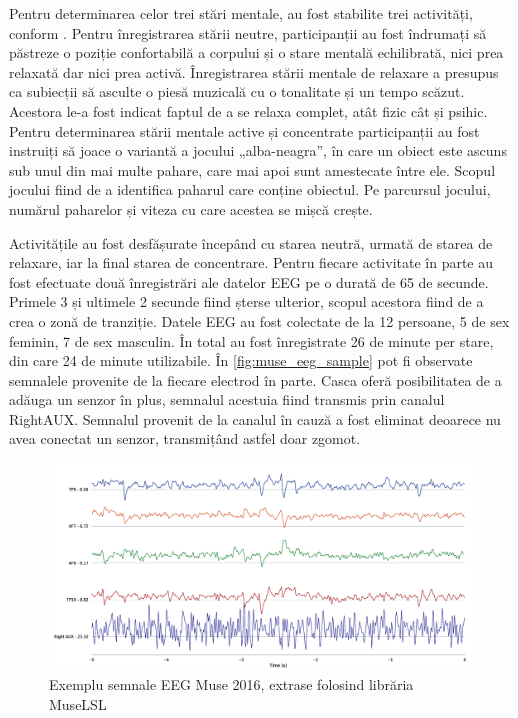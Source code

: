 Pentru determinarea celor trei stări mentale, au fost stabilite trei activități, conform \cite{eeg:2018}. Pentru înregistrarea stării neutre, participanții au fost îndrumați să păstreze o poziție confortabilă a corpului și o stare mentală echilibrată, nici prea relaxată dar nici prea activă. Înregistrarea stării mentale de relaxare a presupus ca subiecții să asculte o piesă muzicală cu o tonalitate și un tempo scăzut. Acestora le-a fost indicat faptul de a se relaxa complet, atât fizic cât și psihic. Pentru determinarea stării mentale active și concentrate participanții au fost instruiți să joace o variantă a jocului „alba-neagra”, în care un obiect este ascuns sub unul din mai multe pahare, care mai apoi sunt amestecate între ele. Scopul jocului fiind de a identifica paharul care conține obiectul. Pe parcursul jocului, numărul paharelor și viteza cu care acestea se mișcă crește.

Activitățile au fost desfășurate începând cu starea neutră, urmată de starea de relaxare, iar la final starea de concentrare. Pentru fiecare activitate în parte au fost efectuate două înregistrări ale datelor EEG pe o durată de 65 de secunde. Primele 3 și ultimele 2 secunde fiind șterse ulterior, scopul acestora fiind de a crea o zonă de tranziție. Datele EEG au fost colectate de la 12 persoane, 5 de sex feminin, 7 de sex masculin. În total au fost înregistrate 26 de minute per stare, din care 24 de minute utilizabile. În \autoref{fig:muse_eeg_sample} pot fi observate semnalele provenite de la fiecare electrod în parte. Casca oferă posibilitatea de a adăuga un senzor în plus, semnalul acestuia fiind transmis prin canalul RightAUX. Semnalul provenit de la canalul în cauză a fost eliminat deoarece nu avea conectat un senzor, transmițând astfel doar zgomot.

\begin{figure}[ht]
\centering
\includegraphics[width=\textwidth, keepaspectratio]{fig/cap3/museEEGplot.png}
\caption{Exemplu semnale EEG Muse 2016, extrase folosind librăria MuseLSL \cite{online:muselsl}}
\label{fig:muse_eeg_sample}
\end{figure}

